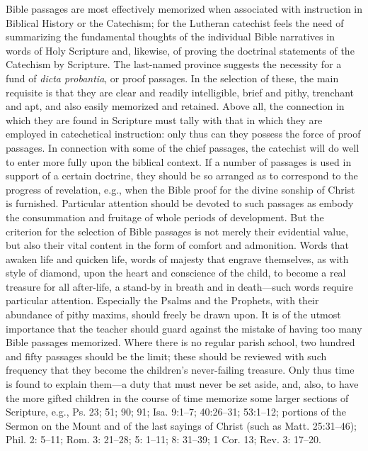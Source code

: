 Bible passages are most effectively memorized when associated with instruction in Biblical History or the Catechism; for the Lutheran catechist feels the need of summarizing the fundamental thoughts of the individual Bible narratives in words of Holy Scripture and, likewise, of proving the doctrinal statements of the Catechism by Scripture. The last-named province suggests the necessity for a fund of \emph{dicta probantia}, or proof passages. In the selection of these, the
main requisite is that they are clear and readily intelligible, brief and pithy, trenchant and apt, and also easily memorized and retained. Above all, the connection in which they are found in Scripture must tally with that in which they are employed in catechetical instruction: only thus can they possess the force of proof passages. In connection with some of the chief passages, the catechist will do well to enter more fully upon the biblical context. If a number of passages is used in support of a certain doctrine, they should be so arranged as to correspond to the progress of revelation, e.g., when the Bible proof for the divine sonship of Christ is furnished. Particular attention should be devoted to such passages as embody the consummation and fruitage of whole periods of development. But the criterion for the selection of Bible passages is not merely their evidential value, but also their vital content in the form of comfort and admonition. Words that awaken life and quicken life, words of majesty that engrave themselves, as with style of diamond, upon the heart and conscience of the child, to become a real treasure for all after-life, a stand-by in breath and in death—such words require particular attention. Especially the Psalms and the Prophets, with their abundance of pithy maxims, should freely be drawn upon. It is of the utmost importance that the teacher should guard against the mistake of having too many Bible passages memorized. Where there is no regular parish school, two hundred and fifty passages should be the limit; these should be reviewed with such frequency that they become the children’s never-failing treasure. Only thus time is found to explain them—a duty that must never be set aside, and, also, to have the more gifted children in the course of time memorize some larger sections of Scripture, e.g., Ps. 23; 51; 90; 91; Isa. 9:1–7; 40:26–31; 53:1–12; portions of the Sermon on the Mount and of the last sayings of Christ (such as Matt. 25:31–46);
Phil. 2: 5–11; Rom. 3: 21–28; 5: 1–11; 8: 31–39; 1 Cor. 13; Rev. 3: 17–20.

